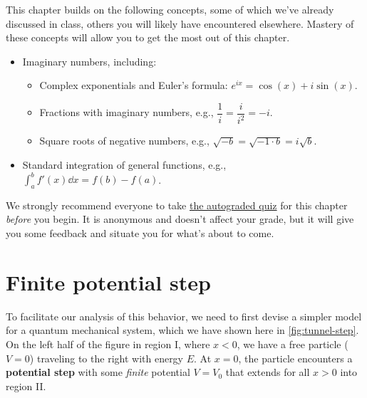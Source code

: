 This chapter builds on the following concepts, some of which we've already discussed in class, others you will likely have encountered elsewhere.
Mastery of these concepts will allow you to get the most out of this chapter.

\begin{itemize}
	\item Imaginary numbers, including:
	\begin{itemize}
		\item Complex exponentials and Euler's formula: $e^{ix} = \cos(x) + i \sin(x)$.
		
		\item Fractions with imaginary numbers, e.g., $\dfrac{1}{i} = \dfrac{i}{i^2} = -i$.
		
		\item Square roots of negative numbers, e.g., $\sqrt{-b} = \sqrt{-1 \cdot b} = i \sqrt{b}$.
	\end{itemize}

	\item Standard integration of general functions, e.g., $\displaystyle\int_{a}^{b} f'(x) \dd{x} = f(b) - f(a)$.
\end{itemize}

\begin{tcolorbox}[colframe=PaloAlto, colbacktitle=PaloAlto!20!white, title=Self-check quiz]
	We strongly recommend everyone to take \href{https://forms.gle/3ki9fxE6VEt61mjc6}{the autograded quiz} for this chapter \emph{before} you begin.
	It is anonymous and doesn't affect your grade, but it will give you some feedback and situate you for what's about to come.
\end{tcolorbox}


\section{Finite potential step}

To facilitate our analysis of this behavior, we need to first devise a simpler model for a quantum mechanical system, which we have shown here in \autoref{fig:tunnel-step}. 
On the left half of the figure in region I, where $x < 0$, we have a free particle ($V = 0$) traveling to the right with energy $E$. 
At $x = 0$, the particle encounters a \textbf{potential step} with some \emph{finite} potential $V = V_0$ that extends for all $x > 0$ into region II.

